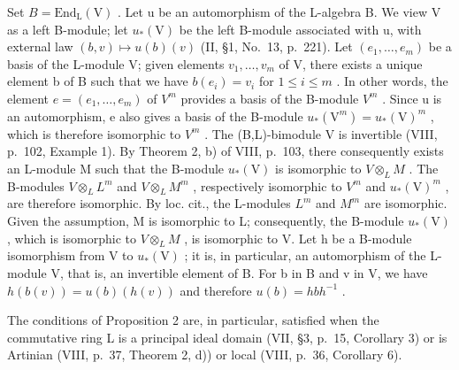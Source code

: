 Set \(B = \text{End}_{\text{L}}(\text{V})\) . Let u be an automorphism of the L-algebra B. We view V as a left B-module; let \(u_{*}(\text{V})\) be the left B-module associated with u, with external law \((b, v) \mapsto u(b)(v)\) (II, §1, No.~13, p.~221). Let \((e_1, \ldots, e_m)\) be a basis of the L-module V; given elements \(v_1, \ldots, v_m\) of V, there exists a unique element b of B such that we have \(b(e_i) = v_i\) for \(1 \leqslant i \leqslant m\) . In other words, the element \(e = (e_1, \ldots, e_m)\) of \(V^m\) provides a basis of the B-module \(V^m\) . Since u is an automorphism, e also gives a basis of the B-module \(u_{*}(\text{V}^m) = u_{*}(\text{V})^m\) , which is therefore isomorphic to \(V^m\) . The (B,L)-bimodule V is invertible (VIII, p.~102, Example 1). By Theorem 2, b) of VIII, p.~103, there consequently exists an L-module M such that the B-module \(u_{*}(\text{V})\) is isomorphic to \(V \otimes_{L} M\) . The B-modules \(V \otimes_{L} L^m\) and \(V \otimes_{L} M^m\) , respectively isomorphic to \(V^m\) and \(u_{*}(\text{V})^m\) , are therefore isomorphic. By loc. cit., the L-modules \(L^m\) and \(M^m\) are isomorphic. Given the assumption, M is isomorphic to L; consequently, the B-module \(u_{*}(\text{V})\) , which is isomorphic to \(V \otimes_{L} M\) , is isomorphic to V. Let h be a B-module isomorphism from V to \(u_{*}(\text{V})\) ; it is, in particular, an automorphism of the L-module V, that is, an invertible element of B. For b in B and v in V, we have \(h(b(v)) = u(b)(h(v))\) and therefore \(u(b) = hbh^{-1}\) .

The conditions of Proposition 2 are, in particular, satisfied when the commutative ring L is a principal ideal domain (VII, §3, p.~15, Corollary 3) or is Artinian (VIII, p.~37, Theorem 2, d)) or local (VIII, p.~36, Corollary 6).


